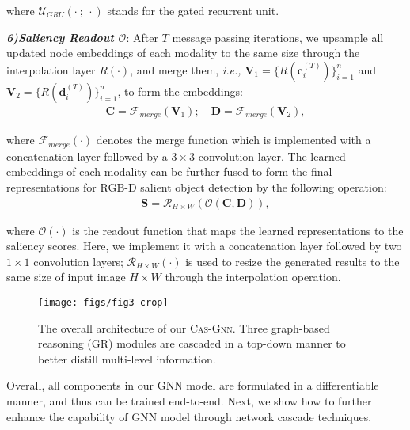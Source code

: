 \documentclass[runningheads]{llncs}
\begin{document}
\noindent where $\mathcal{U}_{GRU}(\cdot~;~\cdot)$ stands for the gated recurrent unit.

\noindent \emph{\textbf{\footnotesize 6)Saliency Readout $\mathcal{O}$}}: After $T$ message passing iterations, we upsample all updated node embeddings of each modality to the same size through the interpolation layer $R(\cdot)$, and merge them, \emph{i.e.,} $\mathbf V_1 = \{R(\mathbf c^{(T)}_i) \}^n_{i=1}$ and $\mathbf V_2 = \{R(\mathbf d^{(T)}_i) \}^n_{i=1}$, to form the embeddings:
\begin{equation}
\begin{aligned}
\mathbf C = {{\mathcal F}_{merge}} (\mathbf V_1); \quad \mathbf D = {\mathcal F}_{merge} (\mathbf V_2),
\label{eq6}
\end{aligned}
\end{equation}

\noindent where ${\mathcal F}_{merge}(\cdot)$ denotes the merge function which is implemented with a concatenation layer followed by a $3\times 3$ convolution layer. The learned embeddings of each modality can be further fused to form the final representations for RGB-D salient object detection by the following operation:
\begin{equation}
\begin{aligned}
\mathbf S = \mathcal{R}_{H\times W} (\mathcal{O} (\mathbf C, \mathbf D)),
\label{eq7}
\end{aligned}
\end{equation}

\noindent where $\mathcal{O}(\cdot)$ is the readout function that maps the learned representations to the saliency scores. Here, we implement it with a concatenation layer followed by two $1\times 1$ convolution layers; $\mathcal{R}_{H\times W}(\cdot)$ is used to resize the generated results to the same size of input image $H\times W$ through the interpolation operation. 

	\begin{figure*}[pt]
	\begin{center}
		\texttt{[image: figs/fig3-crop]}
	\end{center}
	\caption{The overall architecture of our {\scshape{Cas-Gnn}}. Three graph-based reasoning (GR) modules are cascaded in a top-down manner to better distill multi-level information.}
	\label{fig:3}
\end{figure*}

Overall, all components in our GNN model are formulated in a differentiable manner, and thus can be trained end-to-end. Next, we show how to further enhance the capability of GNN model through network cascade techniques. 
\end{document}
